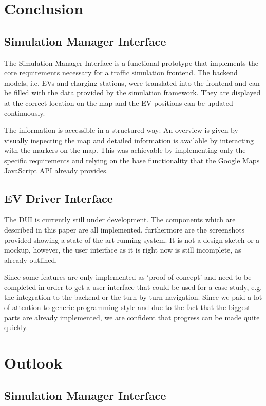 \section{Conclusion}

\subsection{Simulation Manager Interface}

The Simulation Manager Interface is a functional prototype that implements the core requirements necessary for a traffic simulation frontend. The backend models, i.e. EVs and charging stations, were translated into the frontend and can be filled with the data provided by the simulation framework. They are displayed at the correct location on the map and the EV positions can be updated continuously.

The information is accessible in a structured way: An overview is given by visually inspecting the map and detailed information is available by interacting with the markers on the map. This was achievable by implementing only the specific requirements and relying on the base functionality that the Google Maps JavaScript API already provides.

\subsection{EV Driver Interface}

The DUI is currently still under development. The components which are described in this paper are all implemented, furthermore are the screenshots provided showing a state of the art running system. It is not a design sketch or a mockup, however, the user interface as it is right now is still incomplete, as already outlined.

Since some features are only implemented as `proof of concept' and need to be completed in order to get a user interface that could be used for a case study, e.g. the integration to the backend or the turn by turn navigation. Since we paid a lot of attention to generic programming style and due to the fact that the biggest parts are already implemented, we are confident that progress can be made quite quickly.


\section{Outlook}

\subsection{Simulation Manager Interface}

